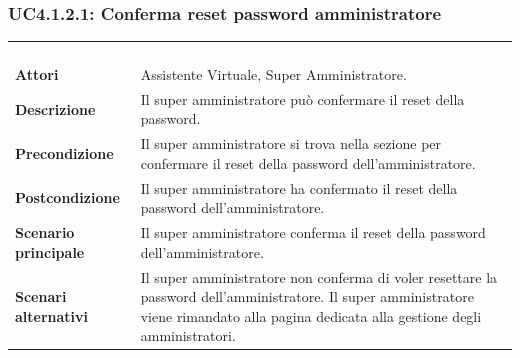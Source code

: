 \subsubsection{UC4.1.2.1: Conferma reset password amministratore}
\label{UC4.1.2.1}
\begin{longtable}{l|p{10cm}}
\rowcolor[gray]{0.8} \multicolumn{2}{c}{} \\
\rowcolor[gray]{0.8} \multicolumn{2}{c}{\textbf{UC4.1.2.1 - Conferma reset password amministratore}} \\
\rowcolor[gray]{0.8} \multicolumn{2}{c}{} \\
\hline
&\\
\textbf{Attori} & Assistente Virtuale, Super Amministratore.\\[7pt]
\textbf{Descrizione} & Il super amministratore può confermare il reset della password.\\[7pt]
\textbf{Precondizione} & Il super amministratore si trova nella sezione per confermare il reset della password dell'amministratore.\\[7pt]
\textbf{Postcondizione} & Il super amministratore ha confermato il reset della password dell'amministratore.\\[7pt]
\textbf{Scenario principale} &Il super amministratore conferma il reset della password dell'amministratore.\\[7pt]
\textbf{Scenari alternativi} & Il super amministratore non conferma di voler resettare la password dell'amministratore. Il super amministratore viene rimandato alla pagina dedicata alla gestione degli amministratori.\\[7pt]\hline
\end{longtable}

